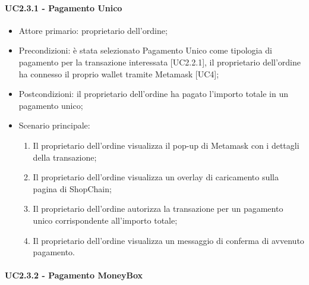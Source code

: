\paragraph{UC2.3.1 - Pagamento Unico}

\begin{itemize}
    \item Attore primario: proprietario dell'ordine;
    \item Precondizioni: è stata selezionato Pagamento Unico come tipologia di pagamento per la transazione interessata [UC2.2.1], 
            il proprietario dell'ordine ha connesso il proprio wallet\glo{} tramite Metamask\glo{} [UC4];
    \item Postcondizioni: il proprietario dell'ordine ha pagato l'importo totale in un pagamento unico;
    \item Scenario principale:
    \begin{enumerate}
        \item Il proprietario dell'ordine visualizza il pop-up di Metamask\glo{} con i dettagli della transazione;
        \item Il proprietario dell'ordine visualizza un overlay di caricamento sulla pagina di ShopChain;
        \item Il proprietario dell'ordine autorizza la transazione per un pagamento unico corrispondente all'importo totale;
        \item Il proprietario dell'ordine visualizza un messaggio di conferma di avvenuto pagamento.
    \end{enumerate}
\end{itemize}

\paragraph{UC2.3.2 - Pagamento MoneyBox}

